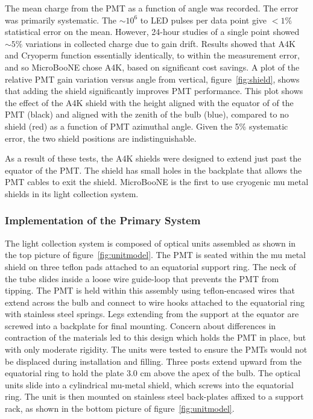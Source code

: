 The mean charge from the PMT as a function of angle was recorded.  The error was primarily systematic.   The $\sim10^6$ to LED pulses per data point give $<1\%$ statistical error on the mean.  However, 24-hour studies of a single point showed $\sim5\%$ variations in collected charge due to gain drift.  Results showed that A4K and Cryoperm function essentially identically, to within the measurement error, and so MicroBooNE chose A4K, based on significant cost savings.    A plot of the relative PMT gain variation versus angle from vertical, figure~\ref{fig:shield}, shows that adding the shield significantly improves PMT performance.  This plot shows the effect of the A4K shield with the height aligned with the equator of of the PMT (black) and aligned with the zenith of the bulb (blue), compared to no shield (red) as a function of PMT azimuthal angle.  Given the 5\% systematic error, the two shield positions are indistinguishable.  

As a result of these tests, the A4K shields were designed to extend just past the equator of the PMT.  The shield has small holes in the backplate that allows the PMT cables to exit the shield.   MicroBooNE is the first \lartpc to use cryogenic mu metal shields in its light collection system.  


\subsubsection{Implementation of the Primary System \label{LCUnitimplement}}


The light collection system is composed of optical units assembled as shown in the top picture of figure~\ref{fig:unitmodel}.  The PMT is seated within the mu metal shield on three teflon pads attached to an equatorial support ring.  The neck of the tube slides inside a loose wire guide-loop that prevents the PMT from tipping.  The PMT is held within this assembly using teflon-encased wires that extend across the bulb and connect to wire hooks attached to the equatorial ring with stainless steel springs. Legs extending from the support at the equator are screwed into a backplate for final mounting.  Concern about differences in contraction of the materials led to this design which holds the PMT in place, but with only moderate rigidity.  The units were tested to ensure the PMTs would not be displaced during installation and filling.  Three posts extend upward from the equatorial ring to hold the plate 3.0 cm above the apex of the bulb.   The optical units slide into a cylindrical mu-metal shield, which screws into the equatorial ring.  The unit is then mounted on stainless steel back-plates affixed to a support rack, as shown in the bottom picture of figure~\ref{fig:unitmodel}.

